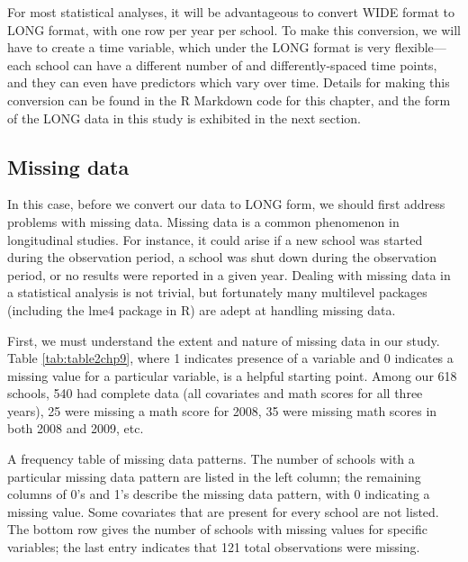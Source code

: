 \documentclass[
]{krantz}
\begin{document}
For most statistical analyses, it will be advantageous to convert WIDE format to LONG format, with one row per year per school. To make this conversion, we will have to create a time variable, which under the LONG format is very flexible---each school can have a different number of and differently-spaced time points, and they can even have predictors which vary over time. Details for making this conversion can be found in the R Markdown code for this chapter, and the form of the LONG data in this study is exhibited in the next section.

\hypertarget{missing}{%
\subsection{Missing data}\label{missing}}

In this case, before we convert our data to LONG form, we should first address problems with missing data.  Missing data is a common phenomenon in longitudinal studies. For instance, it could arise if a new school was started during the observation period, a school was shut down during the observation period, or no results were reported in a given year. Dealing with missing data in a statistical analysis is not trivial, but fortunately many multilevel packages (including the lme4 package in R) are adept at handling missing data.

First, we must understand the extent and nature of missing data in our study. Table \ref{tab:table2chp9}, where 1 indicates presence of a variable and 0 indicates a missing value for a particular variable, is a helpful starting point. Among our 618 schools, 540 had complete data (all covariates and math scores for all three years), 25 were missing a math score for 2008, 35 were missing math scores in both 2008 and 2009, etc.

\label{tab:table2chp9} A frequency table of missing data patterns. The number of schools with a particular missing data pattern are listed in the left column; the remaining columns of 0's and 1's describe the missing data pattern, with 0 indicating a missing value. Some covariates that are present for every school are not listed. The bottom row gives the number of schools with missing values for specific variables; the last entry indicates that 121 total observations were missing.
\end{document}
